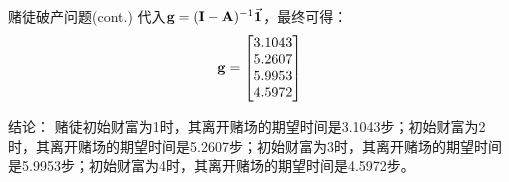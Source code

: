 \documentclass[t]{beamer}
\begin{document}
\begin{frame}{赌徒破产问题(cont.)}
    代入${\bf g}=({\bf I}-{\bf A})^{-1}\vec{\bf 1}$，最终可得：
    \[{\bf g}=\begin{bmatrix}
        3.1043\\
        5.2607\\
        5.9953\\
        4.5972
    \end{bmatrix} \]

    \begin{block}{结论：}
        赌徒初始财富为1时，其离开赌场的期望时间是3.1043步；初始财富为2时，其离开赌场的期望时间是5.2607步；初始财富为3时，其离开赌场的期望时间是5.9953步；初始财富为4时，其离开赌场的期望时间是4.5972步。    
    \end{block}

\end{frame}
\end{document}
